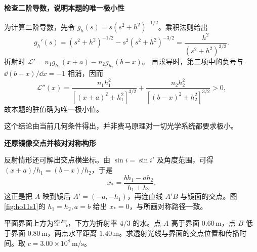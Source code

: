 \begin{solution}
\par\medskip{}\noindent\textbf{检查二阶导数，说明本题的唯一极小性}\par\nobreak
为计算二阶导数，先令 $g_h(s)=s(s^2+h^2)^{-1/2}$。乘积法则给出
\[
 g_h'(s)=(s^2+h^2)^{-1/2}
 -s^2(s^2+h^2)^{-3/2}
 =\frac{h^2}{(s^2+h^2)^{3/2}}.
\]
折射时 $\mathcal L'=n_1g_{h_1}(x+a)-n_2g_{h_2}(b-x)$。
再求导时，第二项中的负号与 $\dd(b-x)/\dd x=-1$ 相消，因而
\[
\mathcal L''(x)=\frac{n_1h_1^2}{[(x+a)^2+h_1^2]^{3/2}}
+\frac{n_2h_2^2}{[(b-x)^2+h_2^2]^{3/2}}>0,
\]
故本题的驻值确为唯一极小值。

这个结论由当前几何条件得出，并非费马原理对一切光学系统都要求极小。


\par\medskip{}\noindent\textbf{还原镜像交点并核对对称构形}\par\nobreak
反射情形还可解出交点横坐标。由 $\sin i=\sin i'$ 及角度范围，可得 $(x+a)/h_1=(b-x)/h_2$，于是
\[
x_* =\frac{bh_1-ah_2}{h_1+h_2}.
\]
这正是把 $A$ 映到镜后 $A'=(-a,-h_1)$，再连直线 $A'B$ 与镜面的交点。图\ref{fig:ho11s1}的 $h_1=h_2,a=b$ 给出 $x_*=0$，与所画对称路径一致。
\end{solution}

\begin{question}
\begin{example}[由端点反求分层光路]\label{ex:r11}
平面界面上方为空气，下方为折射率 \(4/3\) 的水。点 \(A\) 高于界面 \(0.60\,\mathrm m\)，点 \(B\) 低于界面 \(0.80\,\mathrm m\)，两点水平距离 \(1.40\,\mathrm m\)。求透射光线与界面的交点位置和传播时间。取 \(c=3.00\times10^8\,\mathrm{m/s}\)。
\end{example}
\end{question}

